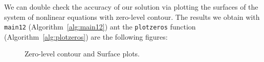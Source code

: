 We can double check the accuracy of our solution via plotting the surfaces of the system of nonlinear equations with zero-level contour. The results we obtain with \texttt{main12} (Algorithm~\ref{alg:main12}) ant the \texttt{plotzeros} function (Algorithm~\ref{alg:plotzeros}) are the following figures:
\begin{figure}[H]
    \centering
    \quad
    \caption{Zero-level contour and Surface plots.}
    \label{fig:main12}
\end{figure}

